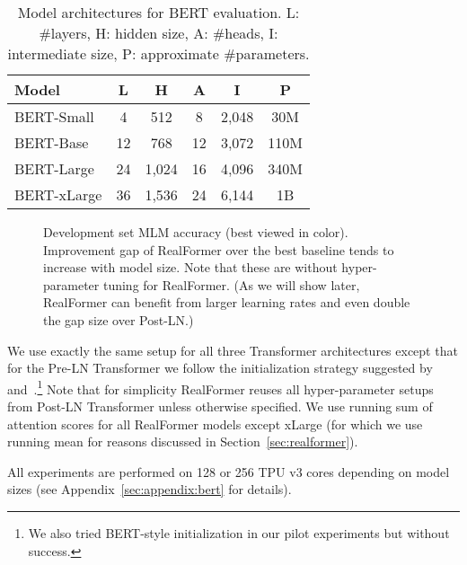 \documentclass[11pt,a4paper]{article}
\begin{document}
\begin{table}
\setlength{\tabcolsep}{5pt}
\centering
\begin{tabular}{l|ccccc}
\hline \textbf{Model} & \textbf{L} & \textbf{H} & \textbf{A} & \textbf{I} & \textbf{P} \\ \hline
BERT-Small  & 4  & 512   & 8  & 2,048 & 30M  \\
BERT-Base   & 12 & 768   & 12 & 3,072 & 110M \\
BERT-Large  & 24 & 1,024 & 16 & 4,096 & 340M \\
BERT-xLarge & 36 & 1,536 & 24 & 6,144 & 1B \\
\hline
\end{tabular}
\caption{\label{table:bert-arch} Model architectures for BERT evaluation. L: \#layers, H: hidden size, A: \#heads, I: intermediate size, P: approximate \#parameters.}
\end{table}

\begin{figure*}
\caption{Development set MLM accuracy (best viewed in color). Improvement gap of RealFormer over the best baseline tends to increase with model size. Note that these are without hyper-parameter tuning for RealFormer. (As we will show later, RealFormer can benefit from larger learning rates and even double the gap size over Post-LN.)}
\label{fig:mlm}
\end{figure*}


We use exactly the same setup for all three Transformer architectures except that for the Pre-LN Transformer we follow the initialization strategy suggested by~\citet{Radford-2019-gpt2} and~\citet{Child-2019-sparsetransformer}.\footnote{We also tried BERT-style initialization in our pilot experiments but without success.} Note that for simplicity RealFormer reuses all hyper-parameter setups from Post-LN Transformer unless otherwise specified.
We use running sum of attention scores for all RealFormer models except xLarge (for which we use running mean for reasons discussed in Section~\ref{sec:realformer}).

All experiments are performed on 128 or 256 TPU v3 cores depending on model sizes (see Appendix~\ref{sec:appendix:bert} for details). 
\end{document}
